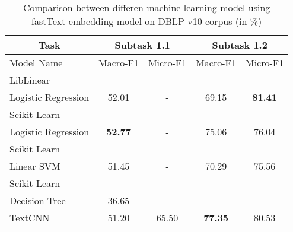 \begin{table}[htbp!] %
    \begin{tabular}{lcccc}
    \toprule
        \multicolumn{1}{c}{Task}           & \multicolumn{2}{c}{Subtask 1.1}    & \multicolumn{2}{c}{Subtask 1.2}    \\
    \midrule
        Model Name                         & Macro-F1         & Micro-F1        & Macro-F1         & Micro-F1        \\
    \midrule
        LibLinear\\ Logistic Regression    & 52.01            & -               & 69.15            & \bf81.41        \\
        Scikit Learn\\ Logistic Regression & \bf52.77         & -               & 75.06            & 76.04           \\
        Scikit Learn\\ Linear SVM          & 51.45            & -               & 70.29            & 75.56           \\
        Scikit Learn\\ Decision Tree       & 36.65            & -               & -                & -               \\
        TextCNN                            & 51.20            & 65.50           & \bf77.35         & 80.53           \\
    \bottomrule
    \end{tabular}
\caption{Comparison between differen machine learning model using fastText embedding model on DBLP v10 corpus (in \%)}
\label{tab:model}
\end{table}
